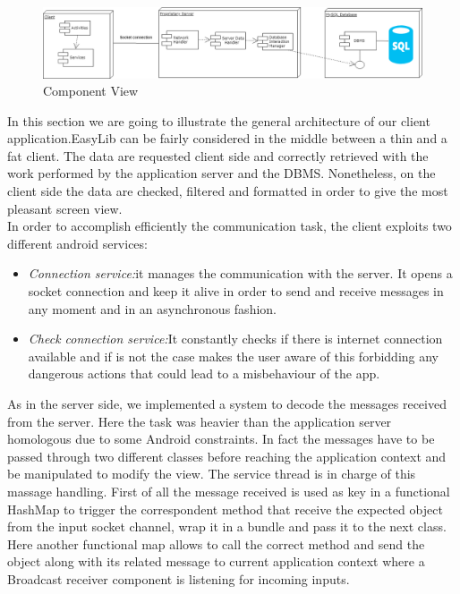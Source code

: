 \vspace*{0.5cm}
\begin{figure}[H]
	\centering
	\includegraphics[scale=0.65]{Images/Diagrams/Component_diagram}
	\caption{Component View}
\end{figure}
\vspace*{0cm}
In this section we are going to illustrate the general architecture of our client application.EasyLib can be fairly considered in the middle between a thin and a fat client. The data are requested client side and correctly retrieved with the work performed by the application server and the DBMS. Nonetheless, on the client side the data are checked, filtered and formatted in order to give the most pleasant screen view.
\\ 
In order to accomplish efficiently the communication task, the client exploits two different android services: 

\begin{itemize}
\item \emph{Connection service:}it manages the communication with the server. It opens a socket connection and keep it alive in order to send and receive messages in any moment and in an asynchronous fashion.
\item \emph{Check connection service:}It constantly checks if there is internet connection available and if is not the case makes the user aware of this forbidding any dangerous actions that could lead to a misbehaviour of the app.
\end{itemize}

As in the server side, we implemented a system to decode the messages received from the server. Here the task was heavier than the application server homologous due to some Android constraints. In fact the messages have to be passed through two different classes before reaching the application context and be manipulated to modify the view. The service thread is in charge of this massage handling. First of all the message received is used as key in a functional HashMap to trigger the correspondent method that receive the expected object from the input socket channel, wrap it in a bundle and pass it to the next class. Here another functional map allows to call the correct method and send the object along with its related message to current application context where a Broadcast receiver component is listening for incoming inputs.


